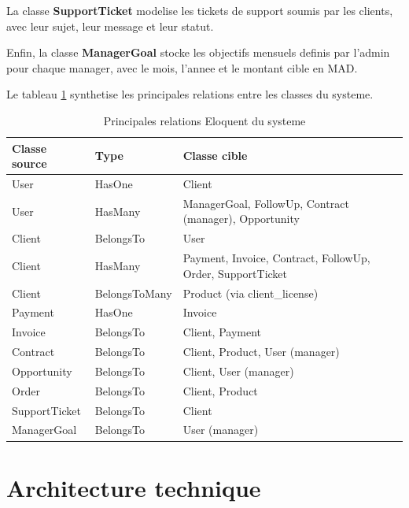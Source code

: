 La classe \textbf{SupportTicket} modelise les tickets de support soumis
par les clients, avec leur sujet, leur message et leur statut.

Enfin, la classe \textbf{ManagerGoal} stocke les objectifs mensuels
definis par l'admin pour chaque manager, avec le mois, l'annee et le
montant cible en MAD.

Le tableau \ref{tab:relations} synthetise les principales relations entre
les classes du systeme.

\vspace{0.4cm}
\begin{table}[H]
\centering
\caption{Principales relations Eloquent du systeme}
\label{tab:relations}
\begin{tabularx}{\textwidth}{@{}llX@{}}
\toprule
\textbf{Classe source} & \textbf{Type} & \textbf{Classe cible} \\
\midrule
User          & HasOne      & Client \\[3pt]
User          & HasMany     & ManagerGoal, FollowUp, Contract (manager), Opportunity \\[3pt]
Client        & BelongsTo   & User \\[3pt]
Client        & HasMany     & Payment, Invoice, Contract, FollowUp, Order, SupportTicket \\[3pt]
Client        & BelongsToMany & Product (via client\_license) \\[3pt]
Payment       & HasOne      & Invoice \\[3pt]
Invoice       & BelongsTo   & Client, Payment \\[3pt]
Contract      & BelongsTo   & Client, Product, User (manager) \\[3pt]
Opportunity   & BelongsTo   & Client, User (manager) \\[3pt]
Order         & BelongsTo   & Client, Product \\[3pt]
SupportTicket & BelongsTo   & Client \\[3pt]
ManagerGoal   & BelongsTo   & User (manager) \\
\bottomrule
\end{tabularx}
\end{table}

\section{Architecture technique}

